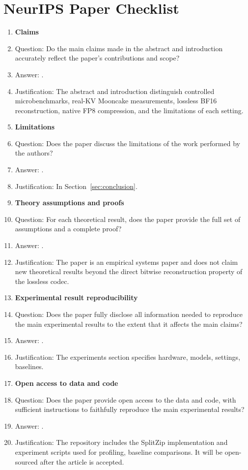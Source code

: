 \section*{NeurIPS Paper Checklist}

\begin{enumerate}

\item {\bf Claims}
    \item[] Question: Do the main claims made in the abstract and introduction accurately reflect the paper's contributions and scope?
    \item[] Answer: \answerYes{}.
    \item[] Justification: The abstract and introduction distinguish controlled microbenchmarks, real-KV Mooncake measurements, lossless BF16 reconstruction, native FP8 compression, and the limitations of each setting.

\item {\bf Limitations}
    \item[] Question: Does the paper discuss the limitations of the work performed by the authors?
    \item[] Answer: \answerYes{}.
    \item[] Justification: In Section~\ref{sec:conclusion}.

\item {\bf Theory assumptions and proofs}
    \item[] Question: For each theoretical result, does the paper provide the full set of assumptions and a complete proof?
    \item[] Answer: \answerNA{}.
    \item[] Justification: The paper is an empirical systems paper and does not claim new theoretical results beyond the direct bitwise reconstruction property of the lossless codec.

\item {\bf Experimental result reproducibility}
    \item[] Question: Does the paper fully disclose all information needed to reproduce the main experimental results to the extent that it affects the main claims?
    \item[] Answer: \answerYes{}.
    \item[] Justification: The experiments section specifies hardware, models, settings, baselines.

\item {\bf Open access to data and code}
    \item[] Question: Does the paper provide open access to the data and code, with sufficient instructions to faithfully reproduce the main experimental results?
    \item[] Answer: \answerYes{}.
    \item[] Justification: The repository includes the SplitZip implementation and experiment scripts used for profiling, baseline comparisons. It will be open-sourced after the article is accepted.


\end{enumerate}
